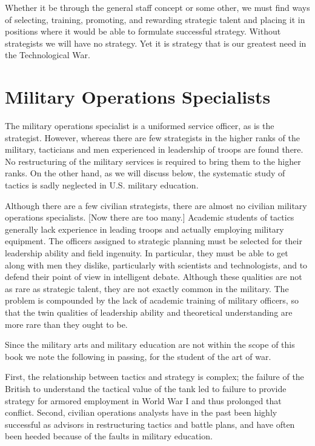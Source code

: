 Whether it be through the general staff concept or some other, we must find ways of selecting, training, promoting, and rewarding strategic talent and placing it in positions where it would be able to formulate successful strategy. Without strategists we will have no strategy. Yet it is strategy that is our greatest need in the Technological War.

\section{Military Operations Specialists}
The military operations specialist is a uniformed service officer, as is the strategist. However, whereas there are few strategists in the higher ranks of the military, tacticians and men experienced in leadership of troops are found there. No restructuring of the military services is required to bring them to the higher ranks. On the other hand, as we will discuss below, the systematic study of tactics is sadly neglected in U.S. military education.

Although there are a few civilian strategists, there are almost no civilian military operations specialists. [Now there are too many.] Academic students of tactics generally lack experience in leading troops and actually employing military equipment. The officers assigned to strategic planning must be selected for their leadership ability and field ingenuity. In particular, they must be able to get along with men they dislike, particularly with scientists and technologists, and to defend their point of view in intelligent debate. Although these qualities are not as rare as strategic talent, they are not exactly common in the military. The problem is compounded by the lack of academic training of military officers, so that the twin qualities of leadership ability and theoretical understanding are more rare than they ought to be.

Since the military arts and military education are not within the scope of this book we note the following in passing, for the student of the art of war.

First, the relationship between tactics and strategy is complex; the failure of the British to understand the tactical value of the tank led to failure to provide strategy for armored employment in World War I and thus prolonged that conflict. Second, civilian operations analysts have in the past been highly successful as advisors in restructuring tactics and battle plans, and have often been heeded because of the faults in military education.

